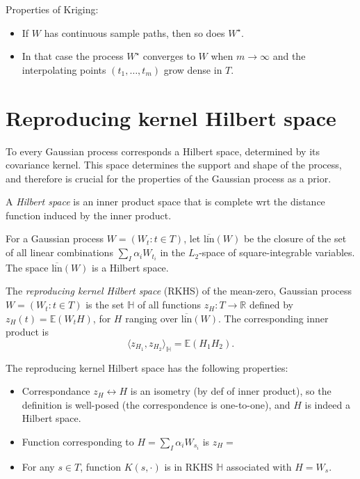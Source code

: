 Properties of Kriging:
	\begin{itemize}
		\item If $W$ has continuous sample paths, then so does $W^\star$. 
		\item In that case the process $W^\star$ converges to $W$ when $m \to \infty$  and the interpolating points $(t_1,\ldots,t_m)$ grow dense in $T$.
	\end{itemize}
	
	
\section{Reproducing kernel Hilbert space}


	To every Gaussian process corresponds a Hilbert space, determined by its covariance kernel. This space determines the support and shape of the process, and therefore is crucial for the properties of the Gaussian process as a prior. 


\begin{definition}
	A \textit{Hilbert space} is an inner product space that is complete wrt the distance function induced by the inner product.
\end{definition}



For a Gaussian process $W = (W_t : t \in T)$, let $\overline{\text{lin}}(W)$ be the closure of the set of all linear combinations $\sum_I \alpha_i W_{t_i}$ in the $L_2$-space of square-integrable variables. The space $\overline{\text{lin}}(W)$ is a Hilbert space.

\begin{definition} 
The \textit{reproducing kernel Hilbert space} (RKHS) of the mean-zero, Gaussian process $W = (W_t : t \in T )$ is the set $\mathbb{H}$ of all functions $z_H:T \to \mathbb{R}$ defined by $z_H(t) = \mathbb{E}(W_t H)$, for $H$ ranging over $\overline{\text{lin}}(W)$. The corresponding inner product is
	$$\langle z_{H_1},z_{H_2}\rangle_{\mathbb{H}} =  \mathbb{E}(H_1H_2).$$
\end{definition}


The reproducing kernel Hilbert space has the following properties:
	\begin{itemize}
		\item Correspondance $z_H \leftrightarrow H$ is an isometry (by def of inner product), so the definition is well-posed (the correspondence is one-to-one), and $H$ is indeed a Hilbert space.
		\item Function corresponding to $H=\sum_I \alpha_i W_{s_i}$ is \bigskip
			$z_H=$
		\item For any $s\in T$, function $K(s,\cdot)$ is in RKHS $\mathbb{H}$ associated with $H = W_s$.
	\end{itemize}


